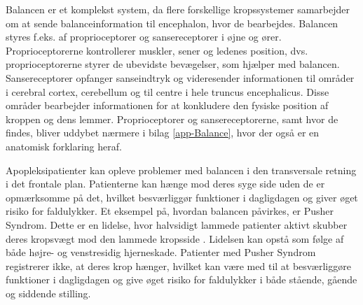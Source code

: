 Balancen er et komplekst system, da flere forskellige kropssystemer samarbejder om at sende balanceinformation til encephalon, hvor de bearbejdes. Balancen styres f.eks. af proprioceptorer og sansereceptorer i øjne og ører. Proprioceptorerne kontrollerer muskler, sener og ledenes position, dvs. proprioceptorerne styrer de ubevidste bevægelser, som hjælper med balancen. \cite{Martini2012} Sansereceptorer opfanger sanseindtryk og videresender informationen til områder i cerebral cortex, cerebellum og til centre i hele truncus encephalicus. Disse områder bearbejder informationen for at konkludere den fysiske position af kroppen og dens lemmer. \cite{Martini2012,Karnath2003} Proprioceptorer og sansereceptorerne, samt hvor de findes, bliver uddybet nærmere i bilag \ref{app-Balance}, hvor der også er en anatomisk forklaring heraf.

Apopleksipatienter kan opleve problemer med balancen i den transversale retning i det frontale plan. Patienterne kan hænge mod deres syge side uden de er opmærksomme på det, hvilket besværliggør funktioner i dagligdagen og giver øget risiko for faldulykker. Et eksempel på, hvordan balancen påvirkes, er Pusher Syndrom. Dette er en lidelse, hvor halvsidigt lammede patienter aktivt skubber deres kropsvægt mod den lammede kropsside \cite{Karnath2003}. Lidelsen kan opstå som følge af både højre- og venstresidig hjerneskade. Patienter med Pusher Syndrom registrerer ikke, at deres krop hænger, hvilket kan være med til at besværliggøre funktioner i dagligdagen og give øget risiko for faldulykker i både stående, gående og siddende stilling. \cite{Karnath2003} 

